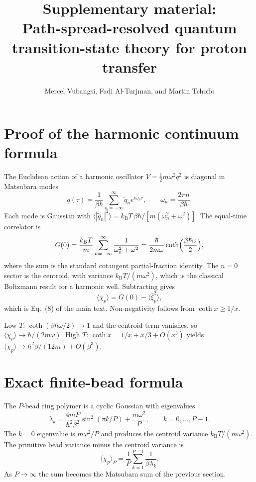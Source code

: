 \documentclass[12pt]{article}
\newcommand{\avg}[1]{\langle #1 \rangle}
\newcommand{\xip}{\bar{\xi}_p}
\newcommand{\chip}{\chi_p}
\newcommand{\kB}{k_{\mathrm{B}}}
\begin{document}
\title{Supplementary material:\\
Path-spread-resolved quantum transition-state theory for proton transfer}
\author{Mercel Vubangsi, Fadi Al-Turjman, and Martin Tchoffo}
\date{}
\maketitle

\section{Proof of the harmonic continuum formula}

The Euclidean action of a harmonic oscillator $V=\tfrac12 m\omega^2 q^2$ is diagonal in Matsubara modes
\begin{equation}
  q(\tau)=\frac{1}{\beta\hbar}\sum_{n=-\infty}^{\infty}\tilde q_n e^{i\omega_n\tau},
  \qquad
  \omega_n=\frac{2\pi n}{\beta\hbar}.
\end{equation}
Each mode is Gaussian with $\avg{|\tilde q_n|^2}=\kB T\,\beta\hbar/[m(\omega_n^2+\omega^2)]$. The equal-time correlator is
\begin{equation}
  G(0)
  =
  \frac{\kB T}{m}\sum_{n=-\infty}^{\infty}\frac{1}{\omega_n^2+\omega^2}
  =
  \frac{\hbar}{2m\omega}\coth\Bigl(\frac{\beta\hbar\omega}{2}\Bigr),
\end{equation}
where the sum is the standard cotangent partial-fraction identity. The $n=0$ sector is the centroid, with variance $\kB T/(m\omega^2)$, which is the classical Boltzmann result for a harmonic well.\cite{cao1994} Subtracting gives
\begin{equation}
  \avg{\chip}=G(0)-\avg{\xip^2},
\end{equation}
which is Eq.~(8) of the main text. Non-negativity follows from $\coth x\ge 1/x$.

Low $T$: $\coth(\beta\hbar\omega/2)\to 1$ and the centroid term vanishes, so $\avg{\chip}\to\hbar/(2m\omega)$. High $T$: $\coth x=1/x+x/3+O(x^3)$ yields $\avg{\chip}\to\hbar^2\beta/(12m)+O(\beta^3)$.

\section{Exact finite-bead formula}

The $P$-bead ring polymer is a cyclic Gaussian with eigenvalues
\begin{equation}
  \lambda_k
  =
  \frac{4mP}{\hbar^2\beta^2}\sin^2(\pi k/P)
  +\frac{m\omega^2}{P},
  \qquad
  k=0,\ldots,P-1.
\end{equation}
The $k=0$ eigenvalue is $m\omega^2/P$ and produces the centroid variance $\kB T/(m\omega^2)$. The primitive bead variance minus the centroid variance is
\begin{equation}
  \avg{\chip}_P
  =
  \frac{1}{P}\sum_{k=1}^{P-1}\frac{1}{\beta\lambda_k}.
\end{equation}
As $P\to\infty$ the sum becomes the Matsubara sum of the previous section.
\end{document}
